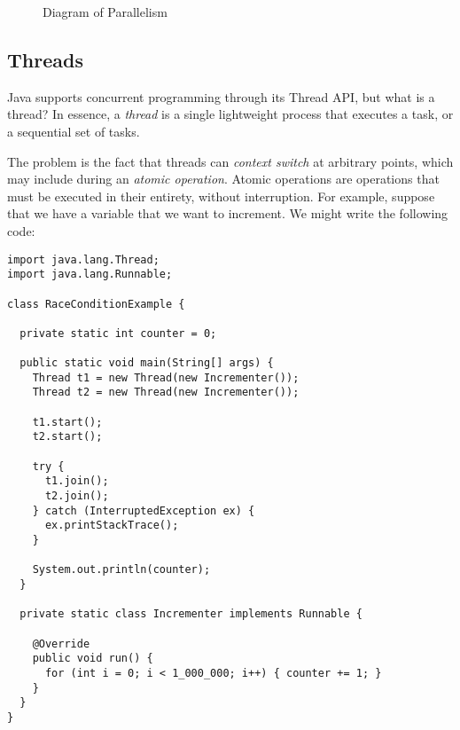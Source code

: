 \begin{figure}[ht]
\centering
{}
\caption{Diagram of Parallelism}
\end{figure}

\subsection{Threads}
Java supports concurrent programming through its Thread API, but what is a thread? 
In essence, a \emph{thread} is a single lightweight process that executes a task, or a sequential set of tasks. 

The problem is the fact that threads can \emph{context switch} at arbitrary points, which may include during an \emph{atomic operation}. 
Atomic operations are operations that must be executed in their entirety, without interruption. 
For example, suppose that we have a variable  that we want to increment. 
We might write the following code:

\begin{lstlisting}[language=MyJava]
import java.lang.Thread;
import java.lang.Runnable;

class RaceConditionExample {

  private static int counter = 0;

  public static void main(String[] args) {
    Thread t1 = new Thread(new Incrementer());
    Thread t2 = new Thread(new Incrementer());

    t1.start();
    t2.start();

    try {
      t1.join();
      t2.join();
    } catch (InterruptedException ex) { 
      ex.printStackTrace(); 
    }
    
    System.out.println(counter);
  }

  private static class Incrementer implements Runnable {

    @Override
    public void run() {
      for (int i = 0; i < 1_000_000; i++) { counter += 1; }
    }
  }
}
\end{lstlisting}

